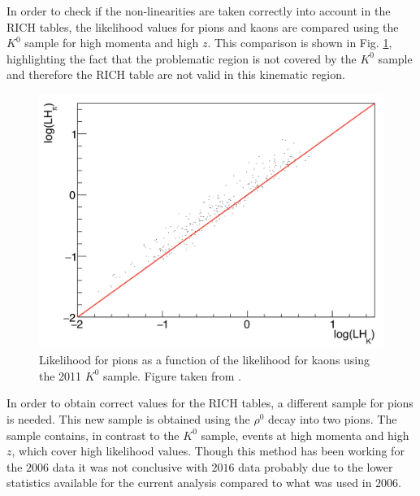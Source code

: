 In order to check if the non-linearities are taken correctly into account in the RICH tables, the likelihood values for pions and kaons are compared using the $K^0$ sample for high momenta and high $z$. This comparison is shown in Fig. \ref{pic:K0sample}, highlighting the fact that the problematic region is not covered by the $K^0$ sample and therefore the RICH table are not valid in this kinematic region.

\begin{figure}[!h]
  \centering
	\includegraphics[scale=0.4]{./gfx/K0sample.png}
	\caption{Likelihood for pions as a function of the likelihood for kaons using the 2011 $K^0$ sample. Figure taken from \cite{RICHnote}.}
	\label{pic:K0sample}
\end{figure}

In order to obtain correct values for the RICH tables, a different sample for pions is needed. This new sample is obtained using the $\rho^0$ decay into two pions. The sample contains, in contrast to the $K^0$ sample, events at high momenta and high $z$, which cover high likelihood values. Though this method has been working for the $2006$ data it was not conclusive with $2016$ data probably due to the lower statistics available for the current analysis compared to what was used in $2006$.

